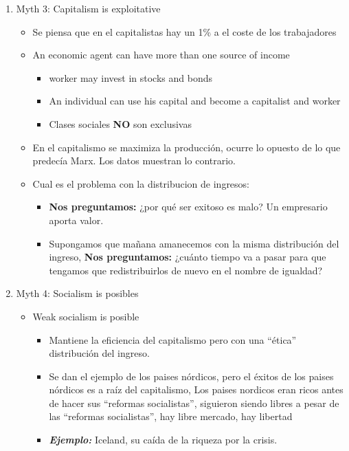 \begin{enumerate}
    \item Myth 3: Capitalism is exploitative
    \begin{itemize}
        \item Se piensa que en el capitalistas hay un 1\% a el coste de los trabajadores
    \end{itemize}
    \begin{itemize}
        \item An economic agent can have more than one source of income 
        \begin{itemize}
            \item worker may invest in stocks and bonds
            \item An individual can use his capital and become a capitalist and worker
            \item Clases sociales \textbf{NO} son exclusivas
        \end{itemize}
    \end{itemize}
    \begin{itemize}
        \item En el capitalismo se maximiza la producción, ocurre lo opuesto de lo que predecía Marx. Los datos muestran lo contrario.
        \item Cual es el problema con la distribucion de ingresos:
        \begin{itemize}
            \item \textbf{Nos preguntamos:} ¿por qué ser exitoso es malo? Un empresario aporta valor.
            \item Supongamos que mañana amanecemos con la misma distribución del ingreso, \textbf{Nos preguntamos:} ¿cuánto tiempo va a pasar para que tengamos que redistribuirlos de nuevo en el nombre de igualdad?
        \end{itemize}
    \end{itemize}

    \item Myth 4: Socialism is posibles
    \begin{itemize}
        \item Weak socialism is posible 
        \begin{itemize}
            \item Mantiene la eficiencia del capitalismo pero con una ``ética'' distribución del ingreso.
            \item Se dan el ejemplo de los paises nórdicos, pero el éxitos de los paises nórdicos es a raíz del capitalismo, Los paises nordicos eran ricos antes de hacer sus ``reformas socialistas'', siguieron siendo libres a pesar de las ``reformas socialistas'', hay libre mercado, hay libertad
            \item \textbf{\emph{Ejemplo:}} Iceland, su caída de la riqueza por la crisis.
        \end{itemize}
    \end{itemize}


\end{enumerate}

